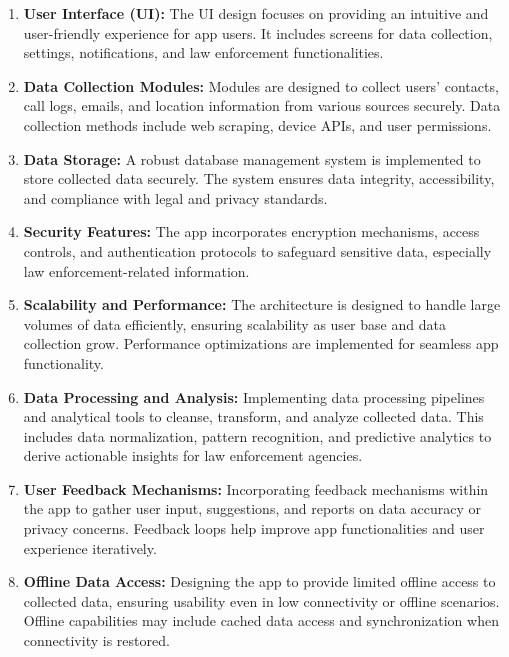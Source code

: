 \begin{enumerate}[label=\arabic*.]
    \item \textbf{User Interface (UI):} The UI design focuses on providing an intuitive and user-friendly experience for app users. It includes screens for data collection, settings, notifications, and law enforcement functionalities.
    
    \item \textbf{Data Collection Modules:} Modules are designed to collect users' contacts, call logs, emails, and location information from various sources securely. Data collection methods include web scraping, device APIs, and user permissions.
    
    \item \textbf{Data Storage:} A robust database management system is implemented to store collected data securely. The system ensures data integrity, accessibility, and compliance with legal and privacy standards.
    
    \item \textbf{Security Features:} The app incorporates encryption mechanisms, access controls, and authentication protocols to safeguard sensitive data, especially law enforcement-related information.

    \item \textbf{Scalability and Performance:} The architecture is designed to handle large volumes of data efficiently, ensuring scalability as user base and data collection grow. Performance optimizations are implemented for seamless app functionality.
    
    \item \textbf{Data Processing and Analysis:} Implementing data processing pipelines and analytical tools to cleanse, transform, and analyze collected data. This includes data normalization, pattern recognition, and predictive analytics to derive actionable insights for law enforcement agencies.
    
    \item \textbf{User Feedback Mechanisms:} Incorporating feedback mechanisms within the app to gather user input, suggestions, and reports on data accuracy or privacy concerns. Feedback loops help improve app functionalities and user experience iteratively.
    
    \item \textbf{Offline Data Access:} Designing the app to provide limited offline access to collected data, ensuring usability even in low connectivity or offline scenarios. Offline capabilities may include cached data access and synchronization when connectivity is restored.
    

\end{enumerate}

